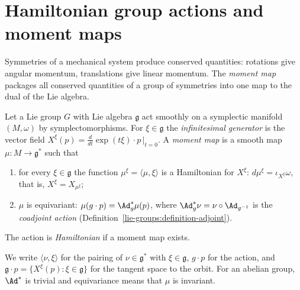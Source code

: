 \section{Hamiltonian group actions and moment maps}\label{symplectic-geometry:section-moment-maps}

Symmetries of a mechanical system produce conserved quantities: rotations give angular momentum, translations give linear momentum. The \emph{moment map} packages all conserved quantities of a group of
symmetries into one map to the dual of the Lie algebra.

\begin{definition}\label{symplectic-geometry:definition-moment-map}
Let a Lie group $G$ with Lie algebra $\mathfrak{g}$ act smoothly on a symplectic manifold $(M, \omega)$ by symplectomorphisms. For $\xi \in \mathfrak{g}$ the \emph{infinitesimal generator} is the vector field
$X^\xi(p) = \frac{d}{dt}\exp(t\xi) \cdot p\,|_{t=0}$. A \emph{moment map} is a smooth map $\mu \colon M \to \mathfrak{g}^*$ such that
\begin{enumerate}
\item for every $\xi \in \mathfrak{g}$ the function $\mu^\xi = \langle\mu, \xi\rangle$ is a Hamiltonian for $X^\xi$: $d\mu^\xi = \iota_{X^\xi}\omega$, that is, $X^\xi = X_{\mu^\xi}$;
\item $\mu$ is equivariant: $\mu(g \cdot p) = \Ad^*_g\mu(p)$, where $\Ad^*_g\nu = \nu \circ \Ad_{g^{-1}}$ is the \emph{coadjoint action} (Definition~\ref{lie-groups:definition-adjoint}).
\end{enumerate}
The action is \emph{Hamiltonian} if a moment map exists.
\end{definition}

\begin{notation}\label{symplectic-geometry:notation-moment-map}
We write $\langle\nu, \xi\rangle$ for the pairing of $\nu \in \mathfrak{g}^*$ with $\xi \in \mathfrak{g}$, $g \cdot p$ for the action, and $\mathfrak{g} \cdot p = \{X^\xi(p) : \xi \in \mathfrak{g}\}$ for the tangent space to
the orbit. For an abelian group, $\Ad^*$ is trivial and equivariance means that $\mu$ is invariant.
\end{notation}

